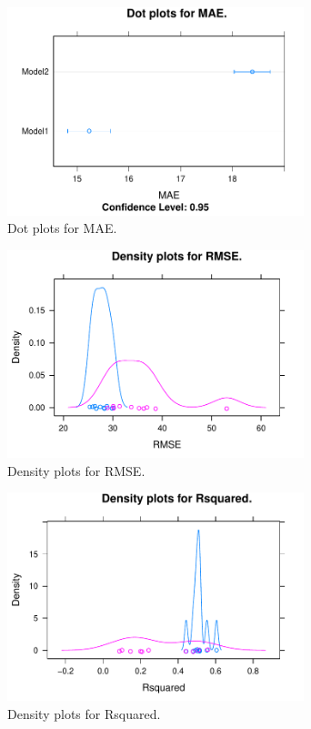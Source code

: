\begin{figure} 
\centering  
\includegraphics[width=0.77\textwidth]{Code_Outputs/ML_compare_models_dotplot_MAE.pdf} 
\caption{\label{fig:ML_compare_modelsdotplot_MAE}Dot plots for MAE.} 
\end{figure} 
 

\begin{figure} 
\centering  
\includegraphics[width=0.77\textwidth]{Code_Outputs/ML_compare_models_densityplot_RMSE.pdf} 
\caption{\label{fig:ML_compare_modelsdensityplot_RMSE}Density plots for RMSE.} 
\end{figure} 
 

\begin{figure} 
\centering  
\includegraphics[width=0.77\textwidth]{Code_Outputs/ML_compare_models_densityplot_Rsquared.pdf} 
\caption{\label{fig:ML_compare_modelsdensityplot_Rsquared}Density plots for Rsquared.} 
\end{figure} 
 

